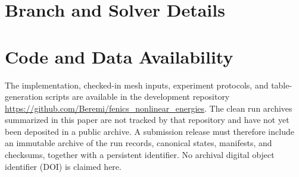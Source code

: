 \documentclass[10pt,a4paper]{article}
\begin{document}
\FloatBarrier
\appendix
\section{Branch and Solver Details}


\section*{Code and Data Availability}
The implementation, checked-in mesh inputs, experiment protocols, and
table-generation scripts are available in the development repository
\url{https://github.com/Beremi/fenics_nonlinear_energies}. The clean run
archives summarized in this paper are not tracked by that repository and have
not yet been deposited in a public archive. A submission release must therefore
include an immutable archive of the run records, canonical states, manifests,
and checksums, together with a persistent identifier. No archival digital
object identifier (DOI) is claimed here.



\end{document}
